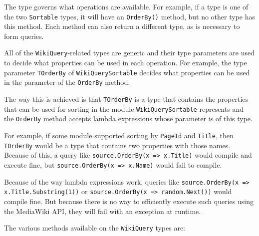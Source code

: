 The type governs what operations are available.
For example, if a type is one of the two \lstinline{Sortable} types,
it will have an \lstinline{OrderBy()} method, but no other type has this method.
Each method can also return a different type, as is necessary to form queries.

\medskip

All of the \lstinline{WikiQuery}-related types are generic
and their type parameters are used to decide what properties can be used in each operation.
For example, the type parameter \lstinline{TOrderBy} of \lstinline{WikiQuerySortable}
decides what properties can be used in the parameter of the \lstinline{OrderBy} method.

The way this is achieved is that \lstinline{TOrderBy} is a type that contains the properties that can be
used for sorting in the module \lstinline{WikiQuerySortable} represents
and the \lstinline{OrderBy} method accepts lambda expressions whose parameter is of this type.

For example, if some module supported sorting by \lstinline{PageId} and \lstinline{Title},
then \lstinline{TOrderBy} would be a type that contains two properties with those names.
Because of this, a query like \lstinline{source.OrderBy(x => x.Title)} would compile and execute fine,
but \lstinline{source.OrderBy(x => x.Name)} would fail to compile.

Because of the way lambda expressions work, queries like \lstinline[breaklines=true]{source.OrderBy(x => x.Title.Substring(1))} or \lstinline{source.OrderBy(x => random.Next())} would compile fine.
But because there is no way to efficiently execute such queries using the MediaWiki API,
they will fail with an exception at runtime.

\medskip

The various methods available on the \lstinline{WikiQuery} types are:


